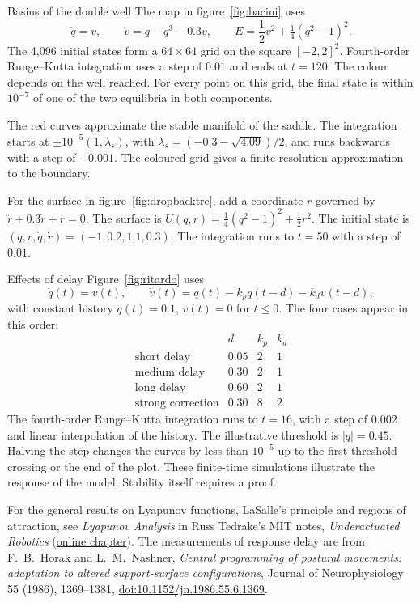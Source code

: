 \begin{formule}{Basins of the double well}
The map in figure~\ref{fig:bacini} uses
\[
 \dot q=v,\qquad \dot v=q-q^3-0.3v,\qquad
 E=\frac{1}{2}v^2+\tfrac14(q^2-1)^2.
\]
The 4,096 initial states form a $64\times64$ grid on the square $[-2,2]^2$. Fourth-order Runge--Kutta integration uses a step of $0.01$ and ends at $t=120$. The colour depends on the well reached. For every point on this grid, the final state is within $10^{-7}$ of one of the two equilibria in both components.

The red curves approximate the stable manifold of the saddle. The integration starts at $\pm10^{-5}(1,\lambda_s)$, with $\lambda_s=(-0.3-\sqrt{4.09})/2$, and runs backwards with a step of $-0.001$. The coloured grid gives a finite-resolution approximation to the boundary.

For the surface in figure~\ref{fig:dropbacktre}, add a coordinate $r$ governed by $\ddot r+0.3\dot r+r=0$. The surface is $U(q,r)=\tfrac14(q^2-1)^2+\frac{1}{2}r^2$. The initial state is $(q,r,\dot q,\dot r)=(-1,0.2,1.1,0.3)$. The integration runs to $t=50$ with a step of $0.01$.
\end{formule}

\begin{formule}{Effects of delay}
Figure~\ref{fig:ritardo} uses
\[
 \dot q(t)=v(t),\qquad
 \dot v(t)=q(t)-k_pq(t-d)-k_dv(t-d),
\]
with constant history $q(t)=0.1$, $v(t)=0$ for $t\le0$. The four cases appear in this order:
\[
\begin{array}{lccc}
 &d&k_p&k_d\\
 \text{short delay}&0.05&2&1\\
 \text{medium delay}&0.30&2&1\\
 \text{long delay}&0.60&2&1\\
 \text{strong correction}&0.30&8&2
\end{array}
\]
The fourth-order Runge--Kutta integration runs to $t=16$, with a step of $0.002$ and linear interpolation of the history. The illustrative threshold is $|q|=0.45$. Halving the step changes the curves by less than $10^{-5}$ up to the first threshold crossing or the end of the plot. These finite-time simulations illustrate the response of the model. Stability itself requires a proof.
\end{formule}

For the general results on Lyapunov functions, LaSalle's principle and regions of attraction, see \emph{Lyapunov Analysis} in Russ Tedrake's MIT notes, \emph{Underactuated Robotics} (\href{https://underactuated.mit.edu/lyapunov.html}{online chapter}). The measurements of response delay are from F.~B.~Horak and L.~M.~Nashner, \emph{Central programming of postural movements: adaptation to altered support-surface configurations}, Journal of Neurophysiology 55 (1986), 1369--1381, \href{https://doi.org/10.1152/jn.1986.55.6.1369}{doi:10.1152/jn.1986.55.6.1369}.


